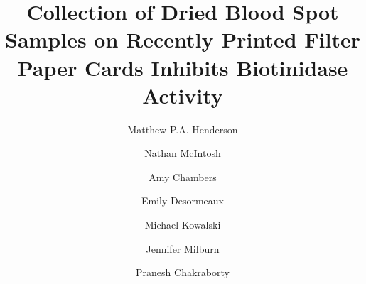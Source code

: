 \documentclass[review]{elsarticle}
\date{}
\title{}
\begin{document}
\makeatletter
\newcommand{\citeprocitem}[2]{\hyper@linkstart{cite}{citeproc_bib_item_#1}#2\hyper@linkend}
\makeatother



\begin{frontmatter}
\title{Collection of Dried Blood Spot Samples on Recently Printed Filter Paper Cards Inhibits Biotinidase Activity}
\author[NSO]{Matthew P.A. Henderson}
\author[NSO]{Nathan McIntosh}
\author[NSO]{Amy Chambers}
\author[NSO]{Emily Desormeaux}
\author[NSO]{Michael Kowalski}
\author[NSO]{Jennifer Milburn}
\author[NSO]{Pranesh Chakraborty}
\address[NSO]{Newborn Screening Ontario, Children's Hospital of Eastern Ontario, 415 Smyth Rd, Ottawa Ontario}
\end{frontmatter}
\end{document}
